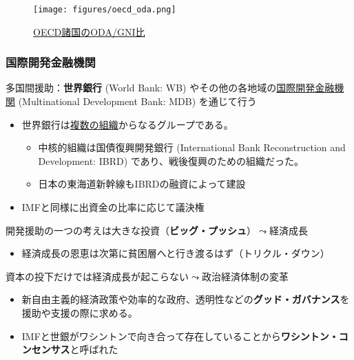 \documentclass[
  xelatex,
  ja=standard]{bxjsarticle}
\providecommand{\tightlist}{%
  \setlength{\itemsep}{0pt}\setlength{\parskip}{0pt}}\usepackage{longtable,booktabs,array}
\begin{document}
\begin{figure}[htpb]

{\centering \texttt{[image: figures/oecd\_oda.png]}

}

\caption{\href{https://twitter.com/OECDdev/status/1646419888825614336}{OECD諸国のODA/GNI比}}

\end{figure}

\hypertarget{ux56fdux969bux958bux767aux91d1ux878dux6a5fux95a2}{%
\subsubsection{国際開発金融機関}\label{ux56fdux969bux958bux767aux91d1ux878dux6a5fux95a2}}

多国間援助：\textbf{世界銀行} (World Bank: WB)
やその他の各地域の\href{https://www.mof.go.jp/policy/international_policy/mdbs/index.html}{国際開発金融機関}
(Multinational Development Bank: MDB) を通じて行う

\begin{itemize}
\tightlist
\item
  世界銀行は\href{https://www.worldbank.org/ja/about}{複数の組織}からなるグループである。

  \begin{itemize}
  \tightlist
  \item
    中核的組織は国債復興開発銀行 (International Bank Reconstruction and
    Development: IBRD) であり、戦後復興のための組織だった。
  \item
    日本の東海道新幹線もIBRDの融資によって建設
  \end{itemize}
\item
  IMFと同様に出資金の比率に応じて議決権
\end{itemize}

開発援助の一つの考えは大きな投資（\textbf{ビッグ・プッシュ}）\(\leadsto\)経済成長

\begin{itemize}
\tightlist
\item
  経済成長の恩恵は次第に貧困層へと行き渡るはず（トリクル・ダウン）
\end{itemize}

資本の投下だけでは経済成長が起こらない\(\leadsto\)政治経済体制の変革

\begin{itemize}
\tightlist
\item
  新自由主義的経済政策や効率的な政府、透明性などの\textbf{グッド・ガバナンス}を援助や支援の際に求める。
\item
  IMFと世銀がワシントンで向き合って存在していることから\textbf{ワシントン・コンセンサス}と呼ばれた
\end{itemize}
\end{document}
